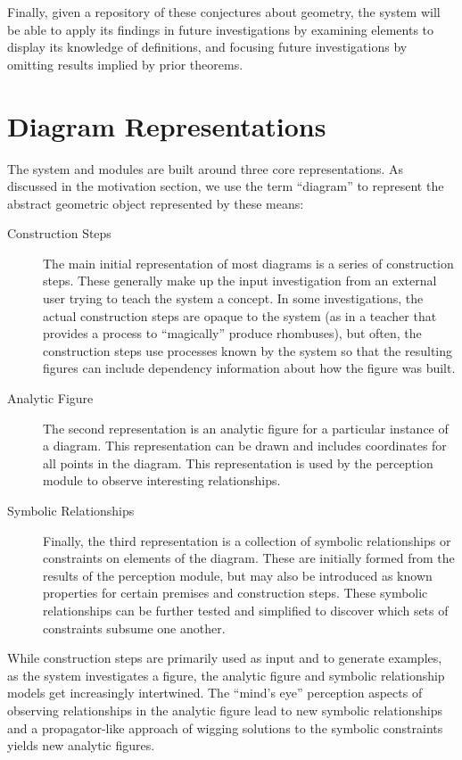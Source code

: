 Finally, given a repository of these conjectures about geometry, the
system will be able to apply its findings in future investigations by
examining elements to display its knowledge of definitions, and
focusing future investigations by omitting results implied by prior
theorems.

\section{Diagram Representations}

The system and modules are built around three core representations. As
discussed in the motivation section, we use the term ``diagram'' to
represent the abstract geometric object represented by these means:

\begin{description}

\item[Construction Steps] The main initial representation of most
  diagrams is a series of construction steps. These generally make up
  the input investigation from an external user trying to teach the
  system a concept. In some investigations, the actual construction
  steps are opaque to the system (as in a teacher that provides a
  process to ``magically'' produce rhombuses), but often, the
  construction steps use processes known by the system so that the
  resulting figures can include dependency information about how the
  figure was built.

\item[Analytic Figure] The second representation is an analytic figure
  for a particular instance of a diagram. This representation can be
  drawn and includes coordinates for all points in the diagram. This
  representation is used by the perception module to observe
  interesting relationships.

\item[Symbolic Relationships] Finally, the third representation is a
  collection of symbolic relationships or constraints on elements of
  the diagram. These are initially formed from the results of the
  perception module, but may also be introduced as known properties
  for certain premises and construction steps. These symbolic
  relationships can be further tested and simplified to discover which
  sets of constraints subsume one another.

\end{description}

While construction steps are primarily used as input and to generate
examples, as the system investigates a figure, the analytic figure and
symbolic relationship models get increasingly intertwined. The ``mind's
eye'' perception aspects of observing relationships in the analytic
figure lead to new symbolic relationships and a propagator-like
approach of wigging solutions to the symbolic constraints yields new
analytic figures.

